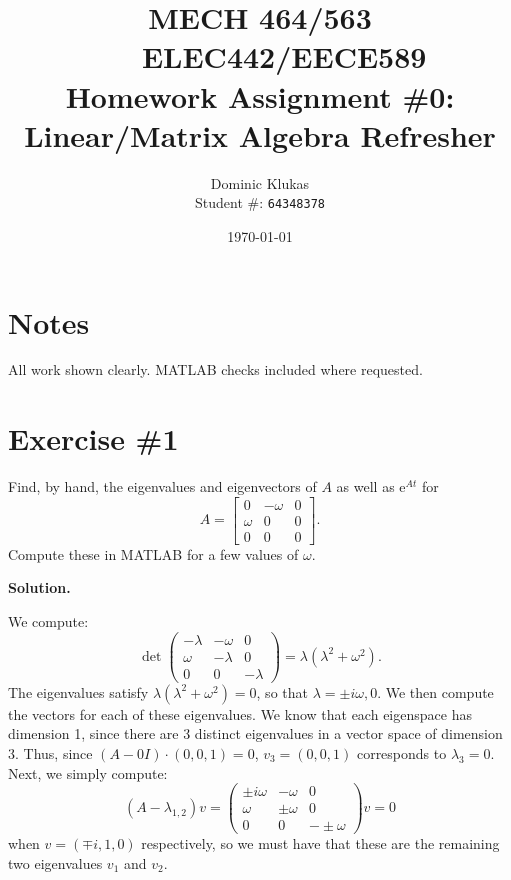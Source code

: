 \documentclass[11pt]{article}
\title{MECH 464/563 \ \ \ ELEC442/EECE589 \\
Homework Assignment \#0: Linear/Matrix Algebra Refresher}
\author{Dominic Klukas \\ Student \#: \texttt{64348378}}
\date{\today}
\newcommand{\e}{\mathrm{e}}
\begin{document}
\maketitle

\section*{Notes}
All work shown clearly. MATLAB checks included where requested.

\section{Exercise \#1}
Find, by hand, the eigenvalues and eigenvectors of $A$ as well as $\e^{At}$ for
\[
A =
\begin{bmatrix}
0 & -\omega & 0\\
\omega & 0 & 0\\
0 & 0 & 0
\end{bmatrix}.
\]
Compute these in MATLAB for a few values of $\omega$.

\textbf{Solution.}

We compute:
\[
    \det \begin{pmatrix} -\lambda & - \omega & 0 \\ \omega & - \lambda & 0 \\ 0 & 0 & - \lambda \end{pmatrix}  = \lambda( \lambda^2 + \omega^2)
.\] 
The eigenvalues satisfy $\lambda(\lambda^2 + \omega^2) = 0$, so that $\lambda = \pm i \omega, 0$.
We then compute the vectors for each of these eigenvalues.
We know that each eigenspace has dimension 1, since there are 3 distinct eigenvalues in a vector space of dimension 3.
Thus, since $(A - 0 I) \cdot (0, 0, 1) = 0 $, $v_3 = (0, 0, 1)$ corresponds to $\lambda_3 = 0$.
Next, we simply compute:
\[
    (A - \lambda_{1, 2}) v =  \begin{pmatrix} \pm i \omega & - \omega & 0 \\ \omega & \pm \omega & 0 \\ 0 & 0 & - \pm \omega \end{pmatrix} v = 0
\] 
when $v = (\mp i, 1, 0)$ respectively, so we must have that these are the remaining two eigenvalues $v_1$ and $v_2$.
\end{document}
